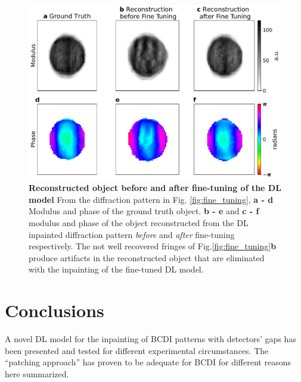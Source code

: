 \begin{figure}[H]
    \centering
    \includegraphics[width=\textwidth]{figures/Inpainting/obj_fine_tuning.pdf}
    \caption{\textbf{Reconstructed object before and after fine-tuning of the DL model} From the diffraction pattern in 
    Fig. \ref{fig:fine_tuning}, \textbf{a - d} Modulus and phase of the ground truth object. \textbf{b - e} and \textbf{c - f} 
    modulus and phase of the object reconstructed from the DL inpainted diffraction pattern \textit{before} and 
    \textit{after} fine-tuning respectively. The not well recovered fringes of Fig.\ref{fig:fine_tuning}\textbf{b} 
    produce artifacts in the reconstructed object that are eliminated with the inpainting of the fine-tuned DL model.
    }
    \label{fig:obj_fine_tuning}
\end{figure}
\section{Conclusions}

A novel DL model for the inpainting of BCDI patterns with detectors' gaps has been presented and tested for different 
experimental circumstances. The ``patching approach'' has proven to be adequate for BCDI for different reasons here summarized. 

